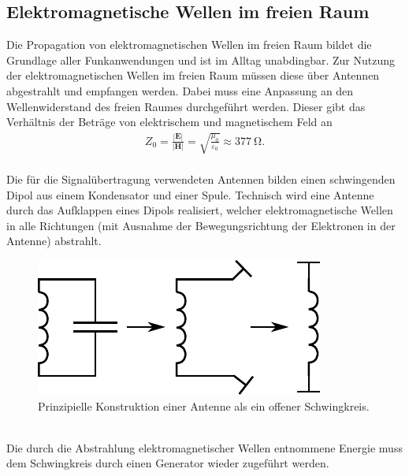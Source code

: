 \documentclass[a4paper,twoside,final]{article}
\begin{document}
\subsection{Elektromagnetische Wellen im freien Raum}
Die Propagation von elektromagnetischen Wellen im freien Raum bildet die Grundlage aller Funkanwendungen und ist im Alltag unabdingbar. Zur Nutzung der elektromagnetischen Wellen im freien Raum müssen diese über Antennen abgestrahlt und empfangen werden. Dabei muss eine Anpassung an den Wellenwiderstand des freien Raumes durchgeführt werden. Dieser gibt das Verhältnis der Beträge von elektrischem und magnetischem Feld an
\begin{align}
  Z_0 = \frac{|\bm{E}|}{|\bm{H}|} = \sqrt{\frac{\mu_0}{\varepsilon_0}} \approx \SI{377}{\ohm}.
\end{align}\\
Die für die Signalübertragung verwendeten Antennen bilden einen schwingenden Dipol aus einem Kondensator und einer Spule. Technisch wird eine Antenne durch das Aufklappen eines Dipols realisiert, welcher elektromagnetische Wellen in alle Richtungen (mit Ausnahme der Bewegungsrichtung der Elektronen in der Antenne) abstrahlt.
\begin{figure}[htp]
    \centering
    \includegraphics{Schaltungen/offenerSchwingkreis.pdf}
    \caption{Prinzipielle Konstruktion einer Antenne als ein offener Schwingkreis.}
    \label{fig:Schwingkreis}
\end{figure}\\
Die durch die Abstrahlung elektromagnetischer Wellen entnommene Energie muss dem Schwingkreis durch einen Generator wieder zugeführt werden.
\end{document}
